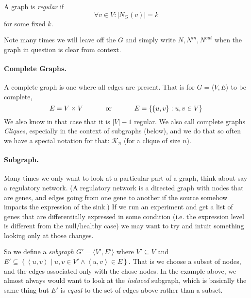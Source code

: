 A graph is \emph{regular} if \[\forall v \in V : |N_G(v)| = k\] for some fixed $k$. 

Note many times we will leave off the $G$ and simply write $N,N^{in},N^{out}$ when the graph in question is clear from context. 


\paragraph{Complete Graphs.}
A complete graph is one where all edges are present. 
That is for $G=\langle V, E\rangle$ to be complete, 
\[E= V\times V \textnormal{\hspace{3em} or \hspace{3em}} E= \left\{\left\{u,v\right\} : u,v \in V\right\}\]
We also know in that case that it is $|V|-1$ regular.
We also call complete graphs \emph{Cliques}, especially in the context of subgraphs (below), 
and we do that so often we have a special notation for that: $\mathcal{K}_n$ (for a clique of size $n$). 


\paragraph{Subgraph.}
Many times we only want to look at a particular part of a graph, 
think about say a regulatory network.
(A regulatory network is a directed graph with nodes that are genes, 
and edges going from one gene to another if the source somehow impacts the expression of the sink.) 
If we run an experiment and get a list of genes that are differentially expressed in some condition 
(i.e. the expression level is different from the null/healthy case) 
we may want to try and intuit something looking only at those changes. 

So we define a \emph{subgraph} $G' = \langle V', E'\rangle$ where 
$V' \subseteq V$ and $E' \subseteq \left\{\left\langle u,v\right\rangle \mid u,v\in V'\wedge \left\langle u,v\right\rangle \in E \right\}$.
That is we choose a subset of nodes, and the edges associated only with the chose nodes. 
In the example above, we almost always would want to look at the \emph{induced} subgraph, which is basically the same thing
but $E'$ is \textit{equal} to the set of edges above rather than a subset.

